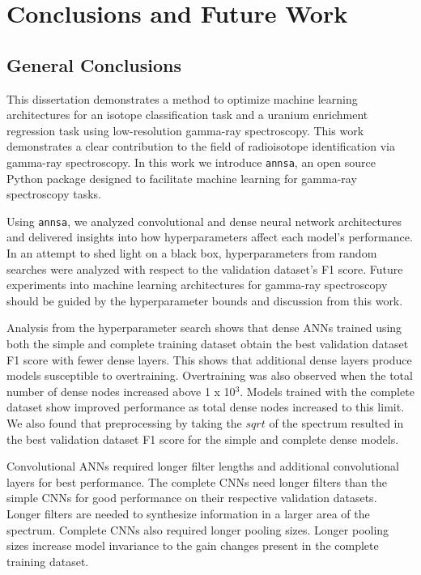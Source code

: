 \chapter{Conclusions and Future Work}

\section{General Conclusions}

This dissertation demonstrates a method to optimize machine learning architectures for an isotope classification task and a uranium enrichment regression task using low-resolution gamma-ray spectroscopy. This work demonstrates a clear contribution to the field of radioisotope identification via gamma-ray spectroscopy. In this work we introduce \verb|annsa|, an open source Python package designed to facilitate machine learning for gamma-ray spectroscopy tasks. 

Using \verb|annsa|, we analyzed convolutional and dense neural network architectures and delivered insights into how hyperparameters affect each model's performance. In an attempt to shed light on a black box, hyperparameters from random searches were analyzed with respect to the validation dataset's F1 score. Future experiments into machine learning architectures for gamma-ray spectroscopy should be guided by the hyperparameter bounds and discussion from this work.

Analysis from the hyperparameter search shows that dense ANNs trained using both the simple and complete training dataset obtain the best validation dataset F1 score with fewer dense layers. This shows that additional dense layers produce models susceptible to overtraining. Overtraining was also observed when the total number of dense nodes increased above 1 x 10$^{3}$. Models trained with the complete dataset show improved performance as total dense nodes increased to this limit. We also found that preprocessing by taking the $sqrt$ of the spectrum resulted in the best validation dataset F1 score for the simple and complete dense models. 

Convolutional ANNs required longer filter lengths and additional convolutional layers for best performance. The complete CNNs need longer filters than the simple CNNs for good performance on their respective validation datasets. Longer filters are needed to synthesize information in a larger area of the spectrum. Complete CNNs also required longer pooling sizes. Longer pooling sizes increase model invariance to the gain changes present in the complete training dataset.

